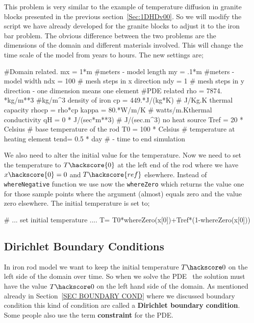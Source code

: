 This problem is very similar to the example of temperature diffusion in granite blocks presented in the previous section~\ref{Sec:1DHDv00}. So we will modify the script we have already developed for the granite blocks to adjust 
it to the iron bar problem.  
The obvious difference between the two problems are the dimensions of the domain and different materials involved. This will change the time scale of the model from years to hours. 
The new settings are;
\begin{python}
#Domain related.
mx = 1*m #meters - model length
my = .1*m #meters - model width
ndx = 100 # mesh steps in x direction 
ndy = 1 # mesh steps in y direction - one dimension means one element
#PDE related
rho = 7874. *kg/m**3 #kg/m^{3} density of iron
cp = 449.*J/(kg*K) # J/Kg.K thermal capacity
rhocp = rho*cp 
kappa = 80.*W/m/K   # watts/m.Kthermal conductivity
qH = 0 * J/(sec*m**3) # J/(sec.m^{3}) no heat source
Tref = 20 * Celsius  # base temperature of the rod
T0 = 100 * Celsius # temperature at heating element
tend= 0.5 * day # - time to end simulation
\end{python}
We also need to alter the initial value for the temperature. Now we need to set the 
temperature to $T\hackscore{0}$ at the left end of the rod where we have $x\hackscore{0}=0$ and 
$T\hackscore{ref}$ elsewhere. Instead of \verb|whereNegative| function we use now the 
\verb|whereZero| which returns the value one for those sample points where 
the argument (almost) equals zero and the value zero elsewhere. The initial
temperature is set to;
\begin{python}
# ... set initial temperature ....
T= T0*whereZero(x[0])+Tref*(1-whereZero(x[0]))
\end{python}

\subsection{Dirichlet Boundary Conditions}
In iron rod model  we want to keep the initial temperature $T\hackscore0$ on the left side of the domain over time. 
So when we solve the PDE~ the solution must have the value $T\hackscore0$ on the left hand
side of the domain. As mentioned already in Section~\ref{SEC BOUNDARY COND} where we discussed
boundary condition this kind of condition are called a \textbf{Dirichlet boundary condition}. Some people also
use the term \textbf{constraint} for the PDE. 

